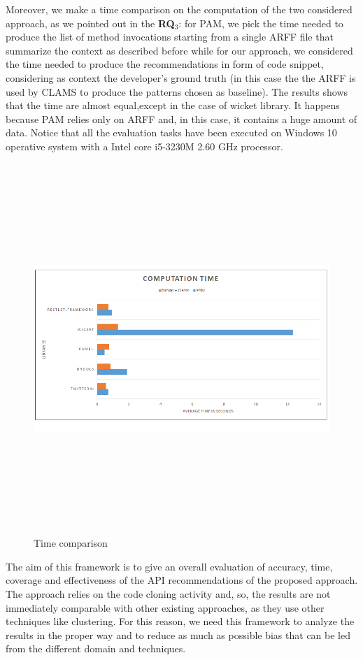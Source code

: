Moreover, we make a time comparison on the computation of the two considered approach, as we pointed out in the \textbf{RQ$_3$}: for PAM, we pick the time needed to produce the list of method invocations starting from a single ARFF file that summarize the context as described before while for our approach, we considered the time needed to produce the recommendations in form of code snippet, considering as context the developer's ground truth (in this case the the ARFF is used by CLAMS to produce the patterns chosen as baseline). The results shows that the time are almost equal,except in the case of wicket library. It happens because PAM relies only on ARFF and, in this case, it contains a huge amount of data. Notice that all the evaluation tasks have been executed on Windows 10 operative system with a Intel core i5-3230M 2.60 GHz processor.

\begin{figure}[H]
\includegraphics[width=14cm,height=14cm,keepaspectratio]{images/time.png}
\centering
\caption{Time comparison}
\label{fig:cmd}
\end{figure}

The aim of this framework is to give an overall evaluation of accuracy, time, coverage and effectiveness of the API recommendations of the proposed approach. The approach relies on the code cloning activity and, so, the results are not immediately comparable with other existing approaches, as they use other techniques like clustering. For this reason, we need this framework to analyze the results in the proper way and to reduce as much as possible bias that can be led from the different domain and techniques. 
